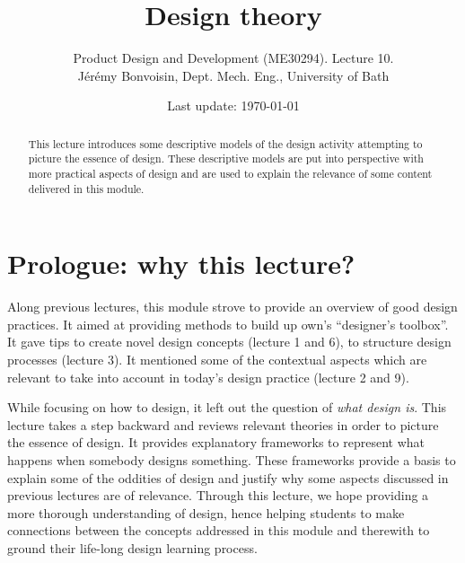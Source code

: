 \documentclass{article}
\newcounter{slide}
\begin{document}
\title{Design theory}

\author{Product Design and Development (ME30294). Lecture 10. \\ Jérémy Bonvoisin, Dept. Mech. Eng., University of Bath}
\date{Last update: \today}

\maketitle

\begin{abstract}
This lecture introduces some descriptive models of the design activity attempting to picture the essence of design. These descriptive models are put into perspective with more practical aspects of design and are used to explain the relevance of some content delivered in this module. 
\end{abstract}

\tableofcontents

\section{Prologue: why this lecture?}
\label{sec:prologue}
Along previous lectures, this module strove to provide an overview of good design practices. It aimed at providing methods to build up own's ``designer's toolbox''. It gave tips to create novel design concepts (lecture 1 and 6), to structure design processes (lecture 3). It mentioned some of the contextual aspects which are relevant to take into account in today's design practice (lecture 2 and 9). 

While focusing on how to design, it left out the question of \emph{what design is}. This lecture takes a step backward and reviews relevant theories in order to picture the essence of design. It provides explanatory frameworks to represent what happens when somebody designs something. These frameworks provide a basis to explain some of the oddities of design and justify why some aspects discussed in previous lectures are of relevance. Through this lecture, we hope providing a more thorough understanding of design, hence helping students to make connections between the concepts addressed in this module and therewith to ground their life-long design learning process.
{}
\end{document}
